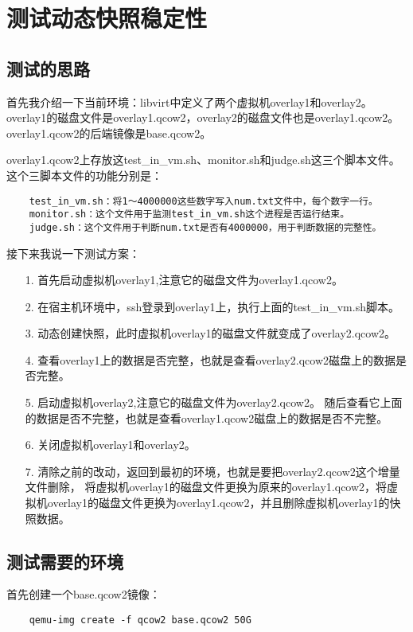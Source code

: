\documentclass[a4paper,left=1.5cm,right=1.5cm,11pt]{article}
\begin{document}

\clearpage

\section{测试动态快照稳定性}
\subsection{测试的思路}
	首先我介绍一下当前环境：libvirt中定义了两个虚拟机overlay1和overlay2。
	overlay1的磁盘文件是overlay1.qcow2，overlay2的磁盘文件也是overlay1.qcow2。
	overlay1.qcow2的后端镜像是base.qcow2。\par

	overlay1.qcow2上存放这test\_in\_vm.sh、monitor.sh和judge.sh这三个脚本文件。
	这个三脚本文件的功能分别是：
	\begin{lstlisting}
	test_in_vm.sh：将1～4000000这些数字写入num.txt文件中，每个数字一行。
	monitor.sh：这个文件用于监测test_in_vm.sh这个进程是否运行结束。
	judge.sh：这个文件用于判断num.txt是否有4000000，用于判断数据的完整性。
	\end{lstlisting}

	接下来我说一下测试方案：
	\begin{itemize}
		\item[1.] 首先启动虚拟机overlay1,注意它的磁盘文件为overlay1.qcow2。
		\item[2.] 在宿主机环境中，ssh登录到overlay1上，执行上面的test\_in\_vm.sh脚本。
		\item[3.] 动态创建快照，此时虚拟机overlay1的磁盘文件就变成了overlay2.qcow2。
		\item[4.] 查看overlay1上的数据是否完整，也就是查看overlay2.qcow2磁盘上的数据是否完整。
		\item[5.] 启动虚拟机overlay2,注意它的磁盘文件为overlay2.qcow2。
				  随后查看它上面的数据是否不完整，也就是查看overlay1.qcow2磁盘上的数据是否不完整。
		\item[6.] 关闭虚拟机overlay1和overlay2。
		\item[7.] 清除之前的改动，返回到最初的环境，也就是要把overlay2.qcow2这个增量文件删除，
		          将虚拟机overlay1的磁盘文件更换为原来的overlay1.qcow2，将虚拟机overlay1的磁盘文件更换为overlay1.qcow2，并且删除虚拟机overlay1的快照数据。
	\end{itemize}

\subsection{测试需要的环境}
	首先创建一个base.qcow2镜像：
	\begin{lstlisting}
	qemu-img create -f qcow2 base.qcow2 50G
	\end{lstlisting}
\end{document}
